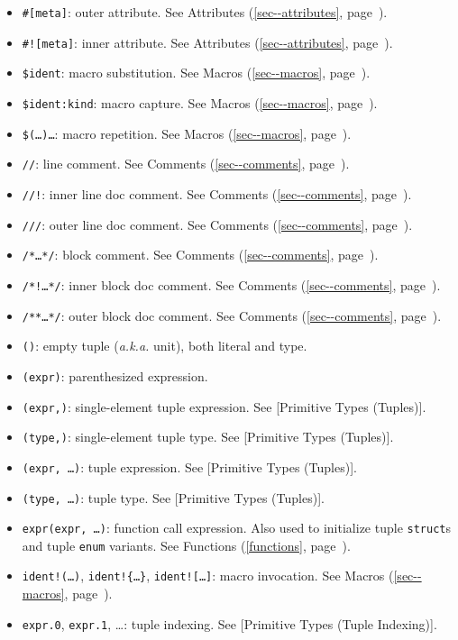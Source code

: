 \documentclass[a4paper,]{book}
\renewcommand*{\hyperlink}[2]{%
 #2 (\autoref{#1}, page~\pageref{#1})}
\providecommand{\tightlist}{%
  \setlength{\itemsep}{0pt}\setlength{\parskip}{0pt}}
\begin{document}
\begin{itemize}
\tightlist
\item
  \texttt{\#{[}meta{]}}: outer attribute. See
  \protect\hyperlink{sec--attributes}{Attributes}.
\item
  \texttt{\#!{[}meta{]}}: inner attribute. See
  \protect\hyperlink{sec--attributes}{Attributes}.
\item
  \texttt{\$ident}: macro substitution. See
  \protect\hyperlink{sec--macros}{Macros}.
\item
  \texttt{\$ident:kind}: macro capture. See
  \protect\hyperlink{sec--macros}{Macros}.
\item
  \texttt{\$(\ldots{})\ldots{}}: macro repetition. See
  \protect\hyperlink{sec--macros}{Macros}.
\end{itemize}

\begin{itemize}
\tightlist
\item
  \texttt{//}: line comment. See
  \protect\hyperlink{sec--comments}{Comments}.
\item
  \texttt{//!}: inner line doc comment. See
  \protect\hyperlink{sec--comments}{Comments}.
\item
  \texttt{///}: outer line doc comment. See
  \protect\hyperlink{sec--comments}{Comments}.
\item
  \texttt{/*\ldots{}*/}: block comment. See
  \protect\hyperlink{sec--comments}{Comments}.
\item
  \texttt{/*!\ldots{}*/}: inner block doc comment. See
  \protect\hyperlink{sec--comments}{Comments}.
\item
  \texttt{/**\ldots{}*/}: outer block doc comment. See
  \protect\hyperlink{sec--comments}{Comments}.
\end{itemize}

\begin{itemize}
\tightlist
\item
  \texttt{()}: empty tuple (\emph{a.k.a.} unit), both literal and type.
\item
  \texttt{(expr)}: parenthesized expression.
\item
  \texttt{(expr,)}: single-element tuple expression. See {[}Primitive
  Types (Tuples){]}.
\item
  \texttt{(type,)}: single-element tuple type. See {[}Primitive Types
  (Tuples){]}.
\item
  \texttt{(expr,\ \ldots{})}: tuple expression. See {[}Primitive Types
  (Tuples){]}.
\item
  \texttt{(type,\ \ldots{})}: tuple type. See {[}Primitive Types
  (Tuples){]}.
\item
  \texttt{expr(expr,\ \ldots{})}: function call expression. Also used to
  initialize tuple \texttt{struct}s and tuple \texttt{enum} variants.
  See \protect\hyperlink{functions}{Functions}.
\item
  \texttt{ident!(\ldots{})}, \texttt{ident!\{\ldots{}\}},
  \texttt{ident!{[}\ldots{}{]}}: macro invocation. See
  \protect\hyperlink{sec--macros}{Macros}.
\item
  \texttt{expr.0}, \texttt{expr.1}, \ldots{}: tuple indexing. See
  {[}Primitive Types (Tuple Indexing){]}.
\end{itemize}
\end{document}
